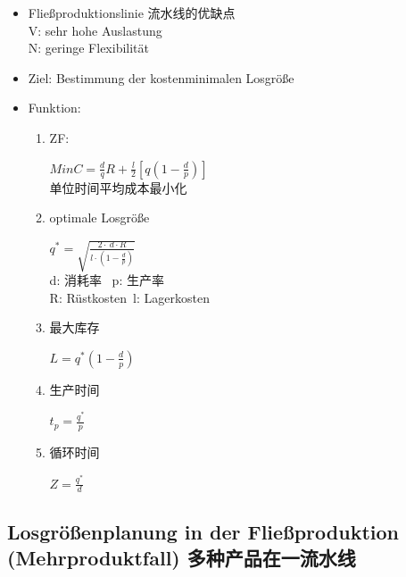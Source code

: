 \documentclass[12pt, letterpaper]{article}
\begin{document}
\begin{CJK*}{UTF8}{gbsn}
\begin{itemize}


\item Fließproduktionslinie 流水线的优缺点\\[1mm]
V: sehr hohe Auslastung\\[1mm]
N: geringe Flexibilität

\item Ziel: Bestimmung der kostenminimalen Losgröße


\item Funktion:

\begin{enumerate}

\item ZF:
\begin{center}
$Min C = \frac{d}{q} R + \frac{l}{2}[q(1-\frac{d}{p})]$\\
单位时间平均成本最小化
\end{center}


\item optimale Losgröße 

\begin{center}
$q^* = \sqrt{\frac{2\cdot\ d \cdot R}{l \cdot (1-\frac{d}{p})}}$\\
d: 消耗率 \ p: 生产率\\ R: Rüstkosten\ l: Lagerkosten
\end{center}

\item 最大库存
\begin{center}
$L = q^*(1-\frac{d}{p})$\\
\end{center}


\item 生产时间
\begin{center}
$t_p = \frac{q^*}{p}$\\
\end{center}

\item 循环时间
\begin{center}
$Z = \frac{q^*}{d}$\\
\end{center}

\end{enumerate}

\end{itemize}



\newpage
\subsection{Losgrößenplanung in der Fließproduktion (Mehrproduktfall) 多种产品在一流水线}


\end{CJK*}
\end{document}
